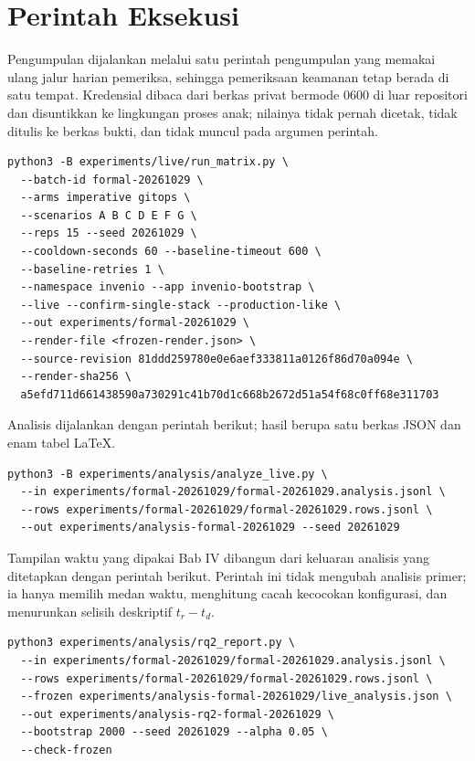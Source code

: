 \section{Perintah Eksekusi}

Pengumpulan dijalankan melalui satu perintah pengumpulan yang memakai ulang jalur harian pemeriksa, sehingga pemeriksaan keamanan tetap berada di satu tempat. Kredensial dibaca dari berkas privat bermode 0600 di luar repositori dan disuntikkan ke lingkungan proses anak; nilainya tidak pernah dicetak, tidak ditulis ke berkas bukti, dan tidak muncul pada argumen perintah.

\begin{lstlisting}[breaklines=true,basicstyle=\ttfamily\footnotesize,columns=fullflexible,keepspaces=true,numbers=none]
python3 -B experiments/live/run_matrix.py \
  --batch-id formal-20261029 \
  --arms imperative gitops \
  --scenarios A B C D E F G \
  --reps 15 --seed 20261029 \
  --cooldown-seconds 60 --baseline-timeout 600 \
  --baseline-retries 1 \
  --namespace invenio --app invenio-bootstrap \
  --live --confirm-single-stack --production-like \
  --out experiments/formal-20261029 \
  --render-file <frozen-render.json> \
  --source-revision 81ddd259780e0e6aef333811a0126f86d70a094e \
  --render-sha256 \
  a5efd711d661438590a730291c41b70d1c668b2672d51a54f68c0ff68e311703
\end{lstlisting}

Analisis dijalankan dengan perintah berikut; hasil berupa satu berkas JSON dan enam tabel LaTeX.

\begin{lstlisting}[breaklines=true,basicstyle=\ttfamily\footnotesize,columns=fullflexible,keepspaces=true,numbers=none]
python3 -B experiments/analysis/analyze_live.py \
  --in experiments/formal-20261029/formal-20261029.analysis.jsonl \
  --rows experiments/formal-20261029/formal-20261029.rows.jsonl \
  --out experiments/analysis-formal-20261029 --seed 20261029
\end{lstlisting}

Tampilan waktu yang dipakai Bab IV dibangun dari keluaran analisis yang ditetapkan dengan perintah berikut. Perintah ini tidak mengubah analisis primer; ia hanya memilih medan waktu, menghitung cacah kecocokan konfigurasi, dan menurunkan selisih deskriptif $t_r-t_d$.

\begin{lstlisting}[breaklines=true,basicstyle=\ttfamily\footnotesize,columns=fullflexible,keepspaces=true,numbers=none]
python3 experiments/analysis/rq2_report.py \
  --in experiments/formal-20261029/formal-20261029.analysis.jsonl \
  --rows experiments/formal-20261029/formal-20261029.rows.jsonl \
  --frozen experiments/analysis-formal-20261029/live_analysis.json \
  --out experiments/analysis-rq2-formal-20261029 \
  --bootstrap 2000 --seed 20261029 --alpha 0.05 \
  --check-frozen
\end{lstlisting}

